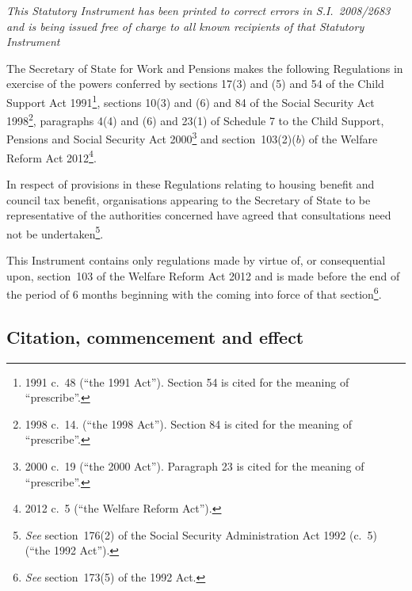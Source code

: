 \documentclass[12pt,a4paper]{article}
\title{\regstitle}
\author{S.I.\ 2012 No.\ 1267}
\date{Made
8th May 2012\\
Laid before Parliament
14th May 2012\\
Coming into~force
4th June 2012
}
\begin{document}
\maketitle

\begin{center}\itshape 
This Statutory Instrument has been printed to correct errors in S.I.~2008/2683 and is being issued free of charge to all known recipients of that Statutory Instrument 
\end{center}

\noindent
The Secretary of State for Work and Pensions makes the following Regulations in exercise of the powers conferred by sections 17(3) and (5) and 54 of the Child Support Act 1991\footnote{1991 c.~48 (“the 1991 Act”). Section 54 is cited for the meaning of “prescribe”.}, sections 10(3) and (6) and 84 of the Social Security Act 1998\footnote{1998 c.~14. (“the 1998 Act”). Section 84 is cited for the meaning of “prescribe”.}, paragraphs 4(4) and (6) and 23(1) of Schedule 7 to the Child Support, Pensions and Social Security Act 2000\footnote{2000 c.~19 (“the 2000 Act”). Paragraph 23 is cited for the meaning of “prescribe”.} and section~103(2)($b$)  of the Welfare Reform Act 2012\footnote{2012 c.~5 (“the Welfare Reform Act”).}.

In respect of provisions in these Regulations relating to housing benefit and council tax benefit, organisations appearing to the Secretary of State to be representative of the authorities concerned have agreed that consultations need not be undertaken\footnote{\emph{See} section~176(2) of the Social Security Administration Act 1992 (c.~5) (“the 1992 Act”).}.

This Instrument contains only regulations made by virtue of, or consequential upon, section~103 of the Welfare Reform Act 2012 and is made before the end of the period of 6 months beginning with the coming into force of that section\footnote{\emph{See} section~173(5) of the 1992 Act.}. 

{\sloppy

\tableofcontents

}

\bigskip

\setcounter{secnumdepth}{-2}

\subsection[1. Citation, commencement and effect]{Citation, commencement and effect}
\end{document}
